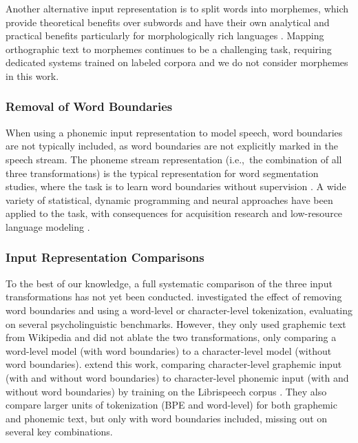Another alternative input representation is to split words into morphemes, which provide theoretical benefits over subwords and have their own analytical and practical benefits particularly for morphologically rich languages \citep{ustun-etal-2018-characters, nzeyimana-niyongabo-rubungo-2022-kinyabert, fan-sun-2023-constructivist}. Mapping orthographic text to morphemes continues to be a challenging task, requiring dedicated systems trained on labeled corpora \citep{batsuren-etal-2022-sigmorphon} and we do not consider morphemes in this work.

\subsubsection{Removal of Word Boundaries}

When using a phonemic input representation to model speech, word boundaries are not typically included, as word boundaries are not explicitly marked in the speech stream. The phoneme stream representation (i.e.,\ the combination of all three transformations) is the typical representation for word segmentation studies, where the task is to learn word boundaries without supervision \citep{Brent1999}. A wide variety of statistical, dynamic programming and neural approaches have been applied to the task, with consequences for acquisition research and low-resource language modeling \citep{Blanchard2010, Coltekin2017, algayres_dp-parse_2022, goriely2023word}.

\subsubsection{Input Representation Comparisons}

To the best of our knowledge, a full systematic comparison of the three input transformations has not yet been conducted.  \citet{hahn-baroni-2019-tabula} investigated the effect of removing word boundaries and using a word-level or character-level tokenization, evaluating on several psycholinguistic benchmarks. However, they only used graphemic text from Wikipedia and did not ablate the two transformations, only comparing a word-level model (with word boundaries) to a character-level model (without word boundaries). \citet{nguyen-2022-word-boundaries} extend this work, comparing character-level graphemic input (with and without word boundaries) to character-level phonemic input (with and without word boundaries) by training on the Librispeech corpus \citep{panayotov2015librispeech}. They also compare larger units of tokenization (BPE and word-level) for both graphemic and phonemic text, but only with word boundaries included, missing out on several key combinations. 

